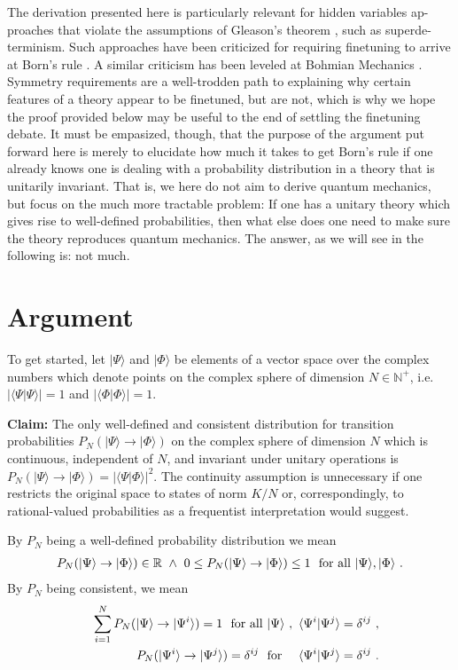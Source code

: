 \documentclass[12pt]{article}
\def\forall{\hbox{\rm for all}}
\def\beqn{\begin{eqnarray}}
\def\eeqn{\end{eqnarray}}
\begin{document}
The derivation presented here is particularly relevant for hidden variables ap- proaches that violate the assumptions of Gleason’s theorem \cite{Gleason}, such as superde- terminism. Such approaches have been criticized for requiring finetuning to arrive at Born’s rule \cite{wood, sen1, sen2}. A similar criticism has been leveled at Bohmian Mechanics \cite{colin}. Symmetry requirements are a well-trodden path to explaining why certain features of a theory appear to be finetuned, but are not, which is why we hope the proof provided below may be useful to the end of settling the finetuning debate.
It must be empasized, though, that the purpose of the argument put forward here is merely to elucidate how much it takes to get Born’s rule if one already knows one is dealing with a probability distribution in a theory that is unitarily invariant. That is, we here do not aim to derive quantum mechanics, but focus on the much more tractable problem: If one has a unitary theory which gives rise to well-defined probabilities, then what else does one need to make sure the theory reproduces quantum mechanics. The answer, as we will see in the following is: not much.

\section{Argument}

To get started, let $|\Psi \rangle$ and $|\Phi \rangle$ be elements of a vector space over the complex numbers which denote points on the complex sphere of dimension $N \in {\mathbb{N}}^+$, i.e. $|\langle \Psi | \Psi \rangle| =1$ and $|\langle \Phi | \Phi \rangle| =1$.
\bigskip

{\bf Claim:} The only well-defined and consistent distribution for transition probabilities $P_N(|\Psi\rangle \to |\Phi\rangle)$ on the complex sphere of dimension $N$ which is continuous, independent of $N$, and invariant under unitary operations is $P_N(| \Psi \rangle \to |\Phi \rangle) = |\langle \Psi | \Phi \rangle|^2$. The continuity assumption is unnecessary if one restricts the original space to states of norm $K/N$ or, correspondingly, to rational-valued probabilities as a frequentist interpretation would suggest. 
\bigskip

\noindent By $P_N$ being a well-defined probability distribution we mean
\beqn
P_N(|\Psi\rangle \to |\Phi\rangle) \in \mathbb{R} ~\wedge~ 0 \leq P_N(|\Psi\rangle \to |\Phi\rangle) \leq 1 ~~\forall~ |\Psi \rangle, |\Phi \rangle ~. \label{welldef}
\eeqn
By $P_N$ being consistent, we mean
\beqn
&& \sum_{i=1}^N P_N(|\Psi\rangle \to |\Psi^i\rangle) = 1 ~~ \forall~ |\Psi \rangle~,~ \langle \Psi^i |\Psi^j\rangle = \delta^{ij} ~, \label{norm} \\
&& P_N(|\Psi^i\rangle \to |\Psi^j\rangle) = \delta^{ij} ~~ {\mbox{for}}~~~~ \langle \Psi^i |\Psi^j\rangle = \delta^{ij} \label{orth}~.
\eeqn
\end{document}
